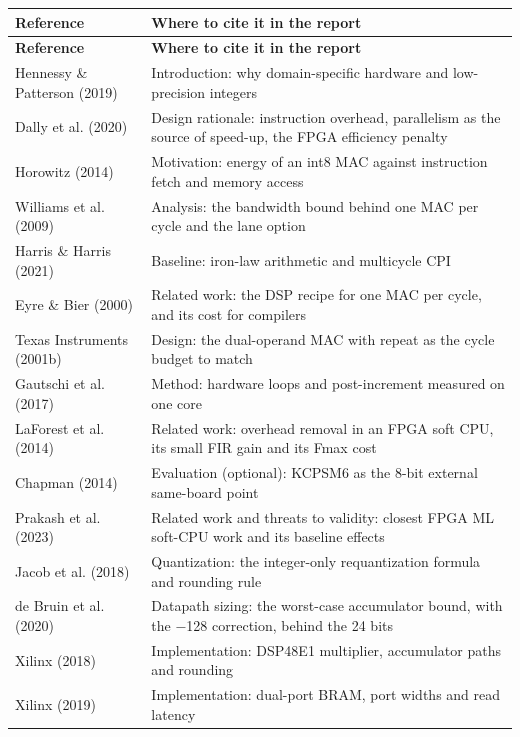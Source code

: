 {\small\setlength{\tabcolsep}{4pt}
\begin{xltabular}{\linewidth}{@{}>{\raggedright\arraybackslash{}\hsize}X>{\raggedright\arraybackslash{}\hsize}X@{}}
\toprule \textsf{\bfseries Reference} & \textsf{\bfseries Where to cite it in the report} \\ \midrule\endfirsthead
\toprule \textsf{\bfseries Reference} & \textsf{\bfseries Where to cite it in the report} \\ \midrule\endhead
\bottomrule\endlastfoot
Hennessy \& Patterson (2019) & Introduction: why domain-specific hardware and low-precision integers \\*
Dally et al. (2020) & Design rationale: instruction overhead, parallelism as the source of speed-up, the FPGA efficiency penalty \\
Horowitz (2014) & Motivation: energy of an int8 MAC against instruction fetch and memory access \\
Williams et al. (2009) & Analysis: the bandwidth bound behind one MAC per cycle and the lane option \\
Harris \& Harris (2021) & Baseline: iron-law arithmetic and multicycle CPI \\
Eyre \& Bier (2000) & Related work: the DSP recipe for one MAC per cycle, and its cost for compilers \\
Texas Instruments (2001b) & Design: the dual-operand MAC with repeat as the cycle budget to match \\
Gautschi et al. (2017) & Method: hardware loops and post-increment measured on one core \\
LaForest et al. (2014) & Related work: overhead removal in an FPGA soft CPU, its small FIR gain and its Fmax cost \\
Chapman (2014) & Evaluation (optional): KCPSM6 as the 8-bit external same-board point \\
Prakash et al. (2023) & Related work and threats to validity: closest FPGA ML soft-CPU work and its baseline effects \\
Jacob et al. (2018) & Quantization: the integer-only requantization formula and rounding rule \\
de Bruin et al. (2020) & Datapath sizing: the worst-case accumulator bound, with the −128 correction, behind the 24 bits \\
Xilinx (2018) & Implementation: DSP48E1 multiplier, accumulator paths and rounding \\*
Xilinx (2019) & Implementation: dual-port BRAM, port widths and read latency \\
\end{xltabular}}

